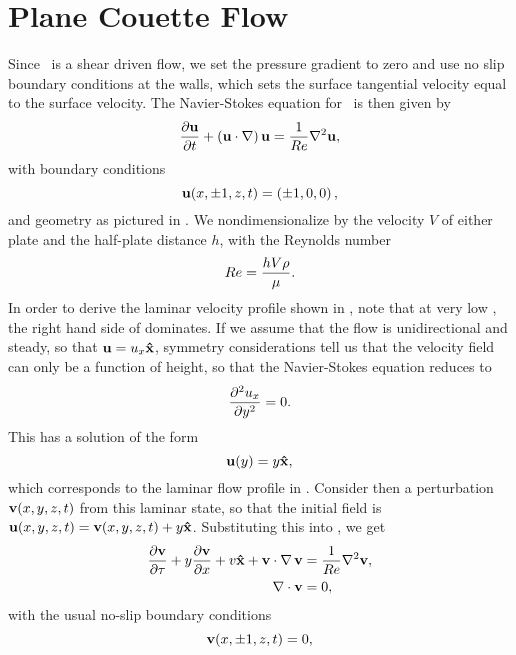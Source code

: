 \section{Plane Couette Flow}
Since \pCf\ is a shear driven flow, we set the pressure gradient to zero and use no slip boundary conditions at the walls, which sets the surface tangential velocity equal to the surface velocity. The Navier-Stokes equation for \pCf\ is then given by 
\begin{equation}\label{eq:NSPCF}
\pder{1}{\Vector{u}}{t} + \paren{\Vector{u}\cdot\nabla}\Vector{u} = \frac{1}{\ReN}\nabla^2\Vector{u},
\end{equation}
with boundary conditions 
\begin{equation}
\mathbf{u}(x,\pm1,z,t) = \left ( \pm1,0,0 \right ),
\end{equation}
and geometry as pictured in . We nondimensionalize by the velocity $V$ of either plate and the half-plate distance $h$, with the Reynolds number
\begin{equation}
Re = \dfrac{hV\rho}{\mu}.
\end{equation} In order to derive the laminar velocity profile shown in , note that at very low \ReN, the right hand side of  dominates. If we assume that the flow is unidirectional and steady, so that $\mathbf{u} = u_x \mathbf{\hat{x}}$, symmetry considerations tell us that the velocity field can only be a function of height, so that the Navier-Stokes equation reduces to 
\begin{equation}
\pder{2}{u_x}{y} = 0.
\end{equation}
This has a solution of the form
\begin{equation}
\mathbf{u}(y) = y\mathbf{\hat{x}},
\end{equation}
which corresponds to the laminar flow profile in . Consider then a perturbation $\mathbf{v}(x,y,z,t)$ from this laminar state, so that the initial field is $\mathbf{u}(x,y,z,t) = \mathbf{v} (x,y,z,t)+ y\mathbf{\hat{x}}$. Substituting this into , we get 
\begin{align}
\pder{1}{\Vector{v}}{\tau} + y\pder{1}{\Vector{v}}{x} + v\Vector{\hat{x}} + \Vector{v}\cdot\Grad{\Vector{v}} &= \frac{1}{\ReN} \nabla^2\Vector{v},\label{eq:PertND}\\
\Div{\Vector{v}} &= 0,
\end{align}
with the usual no-slip boundary conditions 
\begin{equation}
\mathbf{v}(x,\pm 1,z,t) = 0,
\end{equation}

